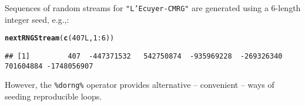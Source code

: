 \documentclass[a4paper,12pt]{article}\usepackage[]{graphicx}\usepackage[]{color}
\makeatletter
\newcommand{\hlnum}[1]{\textcolor[rgb]{0.686,0.059,0.569}{#1}}%
\newcommand{\hlopt}[1]{\textcolor[rgb]{0,0,0}{#1}}%
\newcommand{\hlstd}[1]{\textcolor[rgb]{0.345,0.345,0.345}{#1}}%
\newcommand{\hlkwd}[1]{\textcolor[rgb]{0.737,0.353,0.396}{\textbf{#1}}}%
\newenvironment{kframe}{%
 \def\at@end@of@kframe{}%
 \ifinner\ifhmode%
  \def\at@end@of@kframe{\end{minipage}}%
  \begin{minipage}{\columnwidth}%
 \fi\fi%
 \def\FrameCommand##1{\hskip\@totalleftmargin \hskip-\fboxsep
 \colorbox{shadecolor}{##1}\hskip-\fboxsep
     \hskip-\linewidth \hskip-\@totalleftmargin \hskip\columnwidth}%
 \MakeFramed {\advance\hsize-\width
   \@totalleftmargin\z@ \linewidth\hsize
   \@setminipage}}%
 {\par\unskip\endMakeFramed%
 \at@end@of@kframe}
\newenvironment{knitrout}{}{} %
\let\code=\texttt
\makeatother
\begin{document}
Sequences of random streams for \code{"L'Ecuyer-CMRG"} are generated
using a 6-length integer seed, e.g.,:
\begin{knitrout}\footnotesize
{}\color{fgcolor}\begin{kframe}
\begin{alltt}
\hlkwd{nextRNGStream}\hlstd{(}\hlkwd{c}\hlstd{(}\hlnum{407L}\hlstd{,} \hlnum{1}\hlopt{:}\hlnum{6}\hlstd{))}
\end{alltt}
\begin{verbatim}
## [1]         407  -447371532   542750874  -935969228  -269326340   701604884 -1748056907
\end{verbatim}
\end{kframe}
\end{knitrout}


However, the \code{\%dorng\%} operator provides alternative -- convenient --
ways of seeding reproducible loops.
\end{document}
